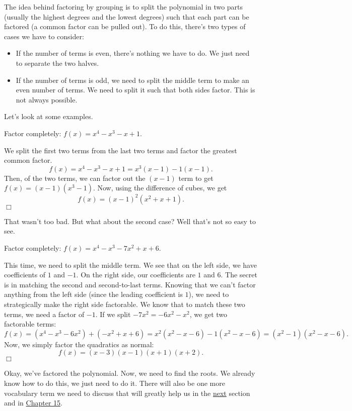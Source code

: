 \documentclass[lang=en,11pt]{elegantbook}
\begin{document}
The idea behind factoring by grouping is to split the polynomial in two parts (usually the highest degrees and the lowest degrees) such that each part can be factored (a common factor can be pulled out).  To do this, there's two types of cases we have to consider: \begin{itemize}
    \item If the number of terms is even, there's nothing we have to do.  We just need to separate the two halves.
    \item If the number of terms is odd, we need to split the middle term to make an even number of terms.  We need to split it such that both sides factor.  This is not always possible.
\end{itemize}
Let's look at some examples.
\begin{example}
Factor completely: $f(x)=x^4-x^3-x+1.$
\end{example}
\begin{solution}
We split the first two terms from the last two terms and factor the greatest common factor. $$f(x)=x^4-x^3-x+1=x^3(x-1)-1(x-1).$$ Then, of the two terms, we can factor out the $(x-1)$ term to get $f(x)=(x-1)(x^3-1).$ Now, using the difference of cubes, we get $$f(x)=(x-1)^2(x^2+x+1).$$ $\Box$
\end{solution}
That wasn't too bad.  But what about the second case? Well that's not so easy to see.
\begin{example}
Factor completely: $f(x)=x^4-x^3-7x^2+x+6$.
\end{example}
\begin{solution}
This time, we need to split the middle term.  We see that on the left side, we have coefficients of $1$ and $-1$.  On the right side, our coefficients are $1$ and $6$.  The secret is in matching the second and second-to-last terms.  Knowing that we can't factor anything from the left side (since the leading coefficient is $1$), we need to strategically make the right side factorable. We know that to match these two terms, we need a factor of $-1$.  If we split $-7x^2=-6x^2-x^2$, we get two factorable terms: $$f(x)=(x^4-x^3-6x^2)+(-x^2+x+6)=x^2(x^2-x-6)-1(x^2-x-6)=(x^2-1)(x^2-x-6).$$ Now, we simply factor the quadratics as normal: $$f(x)=(x-3)(x-1)(x+1)(x+2).$$ $\Box$
\end{solution}
Okay, we've factored the polynomial.  Now, we need to find the roots.  We already know how to do this, we just need to do it. There will also be one more vocabulary term we need to discuss that will greatly help us in the \hyperlink{section.6.5}{next} section and in \hyperlink{chapter.15}{Chapter 15}.
\end{document}
